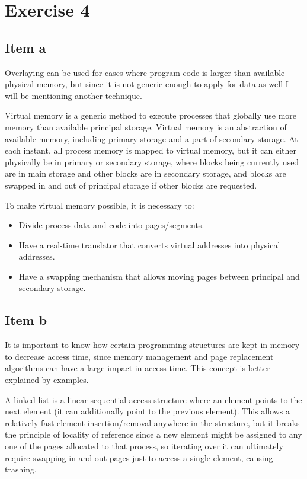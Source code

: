 {\section{Exercise 4}
\subsection{Item a}
Overlaying can be used for cases where program code is larger than available physical memory, but since it is not generic enough to apply for data as well I will be mentioning another technique.

Virtual memory is a generic method to execute processes that globally use more memory than available principal storage. Virtual memory is an abstraction of available memory, including primary storage and a part of secondary storage. At each instant, all process memory is mapped to virtual memory, but it can either physically be in primary or secondary storage, where blocks being currently used are in main storage and other blocks are in secondary storage, and blocks are swapped in and out of principal storage if other blocks are requested.

To make virtual memory possible, it is necessary to:
\begin{itemize}
    \item Divide process data and code into pages/segments.
    \item Have a real-time translator that converts virtual addresses into physical addresses.
    \item Have a swapping mechanism that allows moving pages between principal and secondary storage.
\end{itemize}

\subsection{Item b}
It is important to know how certain programming structures are kept in memory to decrease access time, since memory management and page replacement algorithms can have a large impact in access time. This concept is better explained by examples.

A linked list is a linear sequential-access structure where an element points to the next element (it can additionally point to the previous element). This allows a relatively fast element insertion/removal anywhere in the structure, but it breaks the principle of locality of reference since a new element might be assigned to any one of the pages allocated to that process, so iterating over it can ultimately require swapping in and out pages just to access a single element, causing trashing.

}
